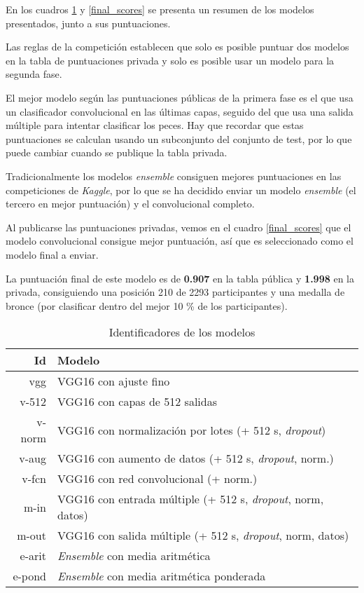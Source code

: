 \begin{itemize}
En los cuadros \ref{model_id} y \ref{final_scores} se presenta un resumen de
los modelos presentados, junto a sus puntuaciones.

Las reglas de la competición establecen que solo es posible puntuar dos modelos
en la tabla de puntuaciones privada y solo es posible usar un modelo para la
segunda fase.

El mejor modelo según las puntuaciones públicas de la primera fase es el que
usa un clasificador convolucional en las últimas capas, seguido del que usa una
salida múltiple para intentar clasificar los peces. Hay que recordar que estas
puntuaciones se calculan usando un subconjunto del conjunto de test, por lo que
puede cambiar cuando se publique la tabla privada.

Tradicionalmente los modelos \textit{ensemble} consiguen mejores puntuaciones
en las competiciones de \textit{Kaggle}, por lo que se ha decidido enviar un
modelo \textit{ensemble} (el tercero en mejor puntuación) y el convolucional
completo.

Al publicarse las puntuaciones privadas, vemos en el cuadro \ref{final_scores}
que el modelo convolucional consigue mejor puntuación, así que es seleccionado
como el modelo final a enviar.

La puntuación final de este modelo es de \textbf{0.907} en la tabla pública y
\textbf{1.998} en la privada, consiguiendo una posición 210 de 2293
participantes y una medalla de bronce (por clasificar dentro del mejor 10 \% de
los participantes).

\begin{table}[]
\centering
\caption{Identificadores de los modelos}
\label{model_id}
\begin{tabular}{rl}
\textbf{Id} & \textbf{Modelo}                                                       \\ \hline
vgg         & VGG16 con ajuste fino                                                 \\
v-512       & VGG16 con capas de 512 salidas                                        \\
v-norm      & VGG16 con normalización por lotes (+ 512 s, \textit{dropout})       \\
v-aug       & VGG16 con aumento de datos (+ 512 s, \textit{dropout}, norm.)       \\
v-fcn       & VGG16 con red convolucional (+ norm.)                                 \\
m-in        & VGG16 con entrada múltiple (+ 512 s, \textit{dropout}, norm, datos) \\
m-out       & VGG16 con salida múltiple (+ 512 s, \textit{dropout}, norm, datos)  \\
e-arit      & \textit{Ensemble} con media aritmética                              \\
e-pond      & \textit{Ensemble} con media aritmética ponderada                   
\end{tabular}
\end{table}


\end{itemize}
